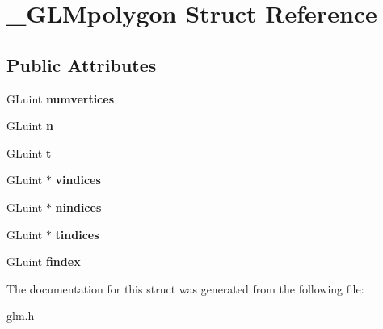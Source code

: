 \hypertarget{struct__GLMpolygon}{\section{\-\_\-\-G\-L\-Mpolygon \-Struct \-Reference}
\label{struct__GLMpolygon}
}
\subsection*{\-Public \-Attributes}
\begin{DoxyCompactItemize}
\item 
\hypertarget{struct__GLMpolygon_a3212480f246df053e6618f92e5784c28}{\-G\-Luint {\bfseries numvertices}}\label{struct__GLMpolygon_a3212480f246df053e6618f92e5784c28}

\item 
\hypertarget{struct__GLMpolygon_aec909c5c529f61b642a31034d0b435b4}{\-G\-Luint {\bfseries n}}\label{struct__GLMpolygon_aec909c5c529f61b642a31034d0b435b4}

\item 
\hypertarget{struct__GLMpolygon_a878a8a32aefb18b89a6d3558c4fbb6ce}{\-G\-Luint {\bfseries t}}\label{struct__GLMpolygon_a878a8a32aefb18b89a6d3558c4fbb6ce}

\item 
\hypertarget{struct__GLMpolygon_afdc176a2c0009573e86dbb71bed6037b}{\-G\-Luint $\ast$ {\bfseries vindices}}\label{struct__GLMpolygon_afdc176a2c0009573e86dbb71bed6037b}

\item 
\hypertarget{struct__GLMpolygon_a01b669800e5c07054222e10808184e35}{\-G\-Luint $\ast$ {\bfseries nindices}}\label{struct__GLMpolygon_a01b669800e5c07054222e10808184e35}

\item 
\hypertarget{struct__GLMpolygon_aa9f687924cfdea4de44b4a2cd83c351e}{\-G\-Luint $\ast$ {\bfseries tindices}}\label{struct__GLMpolygon_aa9f687924cfdea4de44b4a2cd83c351e}

\item 
\hypertarget{struct__GLMpolygon_a1693c3c286d0f917e7f4265dffeca944}{\-G\-Luint {\bfseries findex}}\label{struct__GLMpolygon_a1693c3c286d0f917e7f4265dffeca944}

\end{DoxyCompactItemize}


\-The documentation for this struct was generated from the following file\-:\begin{DoxyCompactItemize}
\item 
glm.\-h\end{DoxyCompactItemize}
